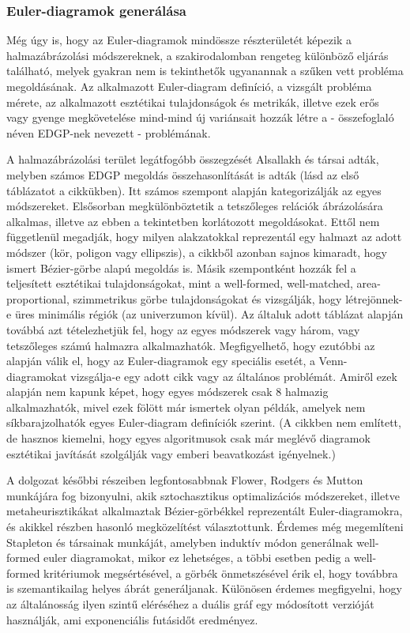 \subsubsection{Euler-diagramok generálása}

Még úgy is, hogy az Euler-diagramok mindössze részterületét képezik a halmazábrázolási módszereknek, a szakirodalomban rengeteg különböző eljárás található, melyek gyakran nem is tekinthetők ugyanannak a szűken vett probléma megoldásának. Az alkalmazott Euler-diagram definíció, a vizsgált probléma mérete, az alkalmazott esztétikai tulajdonságok és metrikák, illetve ezek erős vagy gyenge megkövetelése mind-mind új variánsait hozzák létre a - összefoglaló néven EDGP-nek nevezett - problémának.

A halmazábrázolási terület legátfogóbb összegzését Alsallakh és társai adták\cite{alsallakah2016_the_state_of_the_art_set_visualization}, melyben számos EDGP megoldás összehasonlítását is adták (lásd az első táblázatot a cikkükben). Itt számos szempont alapján kategorizálják az egyes módszereket. Elsősorban megkülönböztetik a tetszőleges relációk ábrázolására alkalmas, illetve az ebben a tekintetben korlátozott megoldásokat. Ettől nem függetlenül megadják, hogy milyen alakzatokkal reprezentál egy halmazt az adott módszer (kör, poligon vagy ellipszis), a cikkből azonban sajnos kimaradt, hogy ismert Bézier-görbe alapú megoldás is\cite{layout_metrics}. Másik szempontként hozzák fel a teljesített esztétikai tulajdonságokat, mint a well-formed, well-matched, area-proportional, szimmetrikus görbe tulajdonságokat és vizsgálják, hogy létrejönnek-e üres minimális régiók (az univerzumon kívül). Az általuk adott táblázat alapján továbbá azt tételezhetjük fel, hogy az egyes módszerek vagy három, vagy tetszőleges számú halmazra alkalmazhatók. Megfigyelhető, hogy ezutóbbi az alapján válik el, hogy az Euler-diagramok egy speciális esetét, a Venn-diagramokat vizsgálja-e egy adott cikk vagy az általános problémát. Amiről ezek alapján nem kapunk képet, hogy egyes módszerek csak 8 halmazig alkalmazhatók\cite{drawability_8_sets}, mivel ezek fölött már ismertek olyan példák\cite{simonetto_undrawable, inductive_euler, drawability_8_sets}, amelyek nem síkbarajzolhatók egyes Euler-diagram definíciók szerint. (A cikkben nem említett, de hasznos kiemelni, hogy egyes algoritmusok csak már meglévő diagramok esztétikai javítását szolgálják\cite{euler_force} vagy emberi beavatkozást igényelnek\cite{sketch_euler}.)

A dolgozat későbbi részeiben legfontosabbnak Flower, Rodgers és Mutton munkájára\cite{layout_metrics} fog bizonyulni, akik sztochasztikus optimalizációs módszereket, illetve metaheurisztikákat alkalmaztak Bézier-görbékkel reprezentált Euler-diagramokra, és akikkel részben hasonló megközelítést választottunk. Érdemes még megemlíteni Stapleton és társainak munkáját\cite{inductive_euler}, amelyben induktív módon generálnak well-formed euler diagramokat, mikor ez lehetséges, a többi esetben pedig a well-formed kritériumok megsértésével, a görbék önmetszésével érik el, hogy továbbra is szemantikailag helyes ábrát generáljanak. Különösen érdemes megfigyelni, hogy az általánosság ilyen szintű eléréséhez a duális gráf egy módosított verzióját használják, ami exponenciális futásidőt eredményez.

